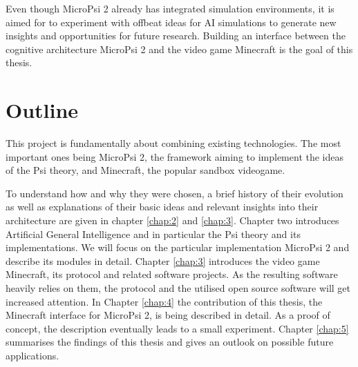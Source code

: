 Even though MicroPsi 2 already has integrated simulation environments, it is aimed for to experiment with offbeat ideas for AI simulations to generate new insights and opportunities for future research. Building an interface between the cognitive architecture MicroPsi 2 and the video game Minecraft is the goal of this thesis.

\section{Outline}
This project is fundamentally about combining existing technologies. The most important ones being MicroPsi 2, the framework aiming to implement the ideas of the Psi theory, and Minecraft, the popular sandbox videogame.

To understand how and why they were chosen, a brief history of their evolution as well as explanations of their basic ideas and relevant insights into their architecture are given in chapter \ref{chap:2} and \ref{chap:3}. Chapter two introduces Artificial General Intelligence and in particular the Psi theory and its implementations. We will focus on the particular implementation MicroPsi 2 and describe its modules in detail. Chapter \ref{chap:3} introduces the video game Minecraft, its protocol and related software projects. As the resulting software heavily relies on them, the protocol and the utilised open source software will get increased attention. 
In Chapter \ref{chap:4} the contribution of this thesis, the Minecraft interface for MicroPsi 2, is being described in detail. As a proof of concept, the description eventually leads to a small experiment.
Chapter \ref{chap:5} summarises the findings of this thesis and gives an outlook on possible future applications.